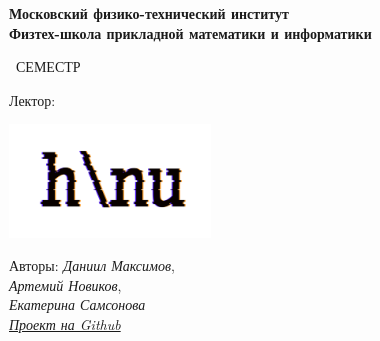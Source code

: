 \begin{titlepage}
	\clearpage\thispagestyle{empty}
	\centering
	
	\textbf{Московский физико-технический институт \\ Физтех-школа прикладной математики и информатики}
	\vspace{33ex}
	
	{\textbf{\FullCourseNameFirstPart}}
	
	\SemesterNumber\ СЕМЕСТР  
	\vspace{1ex}
	
	Лектор: \textit{\LecturerInitials}
	
	\includegraphics[width=0.4\textwidth]{images/logo_ltc.png}

	\begin{flushright}
		\noindent
		Авторы: \textit{Даниил Максимов},
		\\
		\textit{Артемий Новиков},
		\\
		\textit{Екатерина Самсонова}
		\\
		\href{\GithubLink}{\textit{Проект на Github}}
	\end{flushright}
	
	\vfill
	\CourseDate
	\pagebreak
\end{titlepage}
